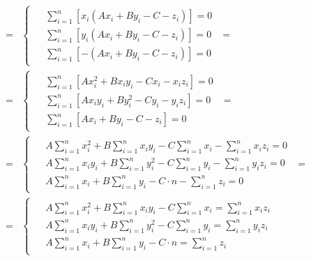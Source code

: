 \begin{align}
    \nonumber
    = &\begin{cases}
           \begin{aligned}
               &\sum_{i=1}^{n} \left[ x_i \left( A x_i + B y_i - C - z_i \right) \right] = 0 \\
               &\sum_{i=1}^{n} \left[ y_i \left( A x_i + B y_i - C - z_i \right) \right] = 0 \\
               &\sum_{i=1}^{n} \left[ - \left( A x_i + B y_i - C - z_i \right) \right] = 0
           \end{aligned}
    \end{cases} = \\ \nonumber
    = &\begin{cases}
           \begin{aligned}
               &\sum_{i=1}^{n} \left[ A x_i^2 + B x_i y_i - C x_i - x_i z_i \right] = 0 \\
               &\sum_{i=1}^{n} \left[ A x_i y_i + B y_i^2 - C y_i - y_i z_i \right] = 0 \\
               &\sum_{i=1}^{n} \left[ A x_i + B y_i - C - z_i \right] = 0
           \end{aligned}
    \end{cases} = \\ \nonumber
    = &\begin{cases}
           \begin{aligned}
               &A \sum_{i=1}^{n} x_i^2
               + B \sum_{i=1}^{n} x_i y_i
               - C \sum_{i=1}^{n} x_i
               - \sum_{i=1}^{n} x_i z_i = 0 \\
               &A \sum_{i=1}^{n} x_i y_i
               + B \sum_{i=1}^{n} y_i^2
               - C \sum_{i=1}^{n} y_i
               - \sum_{i=1}^{n} y_i z_i = 0 \\
               &A \sum_{i=1}^{n} x_i
               + B \sum_{i=1}^{n} y_i
               - C \cdot n - \sum_{i=1}^{n} z_i = 0
           \end{aligned}
    \end{cases} = \\
    = &\begin{cases}
           \label{eq:FindDetail:Plane_MNK_Final_System}
           \begin{aligned}
               &A \sum_{i=1}^{n} x_i^2
               + B \sum_{i=1}^{n} x_i y_i
               - C \sum_{i=1}^{n} x_i
               = \sum_{i=1}^{n} x_i z_i \\
               &A \sum_{i=1}^{n} x_i y_i
               + B \sum_{i=1}^{n} y_i^2
               - C \sum_{i=1}^{n} y_i
               = \sum_{i=1}^{n} y_i z_i \\
               &A \sum_{i=1}^{n} x_i
               + B \sum_{i=1}^{n} y_i
               - C \cdot n = \sum_{i=1}^{n} z_i
           \end{aligned}
    \end{cases}
\end{align} \\

